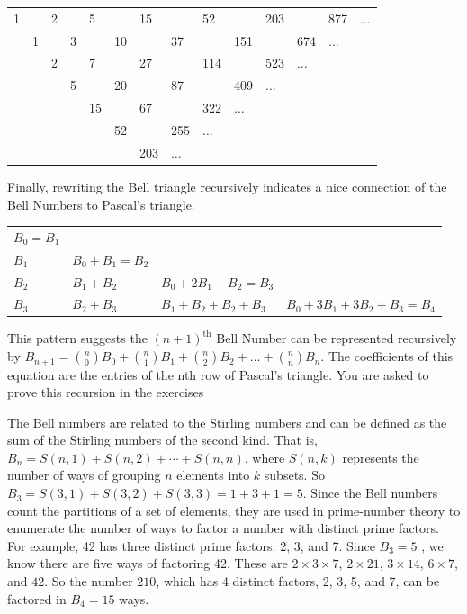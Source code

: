 \documentclass[10pt,]{book}
\theoremstyle{plain}
\theoremstyle{definition}
\theoremstyle{definition}
\theoremstyle{definition}
\theoremstyle{definition}
\numberwithin{equation}{chapter}
\begin{document}
\begin{sidebyside}{1}{0.1}{0.1}{0}
\begin{sbspanel}{0.8}
{\centering%
\begin{tabular}{llllllllllllll}
1&&2&&5&&15&&52&&203&&877&\(\ldots\)\tabularnewline[0pt]
&1&&3&&10&&37&&151&&674&\(\ldots\)&\tabularnewline[0pt]
&&2&&7&&27&&114&&523&\(\ldots\)&&\tabularnewline[0pt]
&&&5&&20&&87&&409&\(\ldots\)&&&\tabularnewline[0pt]
&&&&15&&67&&322&\(\ldots\)&&&&\tabularnewline[0pt]
&&&&&52&&255&\(\ldots\)&&&&&\tabularnewline[0pt]
&&&&&&203&\(\ldots\)&&&&&&
\end{tabular}
\par}
\end{sbspanel}
\end{sidebyside}
\par
\hypertarget{p-1245}{}%
Finally, rewriting the Bell triangle recursively indicates a nice connection of the Bell Numbers to Pascal's triangle.%
\begin{sidebyside}{1}{0.15}{0.15}{0}
\begin{sbspanel}{0.7}
{\centering%
\begin{tabular}{llll}
\(B_{0} = B_{1}\)&&&\tabularnewline[0pt]
\(B_{1}\)&\(B_{0} + B_{1} = B_{2}\)&&\tabularnewline[0pt]
\(B_{2}\)&\(B_{1} + B_{2}\)&\(B_{0} + 2B_{1} + B_{2} = B_{3}\)&\tabularnewline[0pt]
\(B_{3}\)&\(B_{2} + B_{3}\)&\(B_{1} + B_{2} + B_{2} + B_{3}\)&\(B_{0} + 3B_{1} + 3B_{2} + B_{3} = B_{4}\)
\end{tabular}
\par}
\end{sbspanel}
\end{sidebyside}
\par
\hypertarget{p-1246}{}%
This pattern suggests the \({(n + 1)}^{\text{th}}\) Bell Number can be represented recursively by \(B_{n + 1} = \binom{n}{0} B_{0} + \binom{n}{1} B_{1} + \binom{n}{2}B_{2} + \ldots + \binom{n}{n} B_{n}\). The coefficients of this equation are the entries of the nth row of Pascal's triangle. You are asked to prove this recursion in the exercises%
\par
\hypertarget{p-1247}{}%
The Bell numbers are related to the Stirling numbers and can be defined as the sum of the Stirling numbers of the second kind. That is, \(B_{n} = S( n,1 ) + S( n,2 ) + \cdots + S(n,n)\), where \(S(n,k)\) represents the number of ways of grouping \(n\) elements into \(k\) subsets. So \(B_{3} = S( 3,1 ) + S( 3,2 ) + S( 3,3 ) = 1 + 3 + 1 = 5\). Since the Bell numbers count the partitions of a set of elements, they are used in prime-number theory to enumerate the number of ways to factor a number with distinct prime factors. For example, 42 has three distinct prime factors: 2, 3, and 7. Since \(B_{3} = 5\) , we know there are five ways of factoring 42. These are \(2 \times 3 \times 7\), \(2 \times 21\), \(3 \times 14\), \(6 \times 7\), and \(42\). So the number \(210\), which has 4 distinct factors, 2, 3, 5, and 7, can be factored in \(B_{4} = 15\) ways.%
\end{document}
